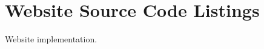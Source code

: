 \chapter{Website Source Code Listings}
\label{appendixC}
\thispagestyle{empty}

\noindent Website implementation.